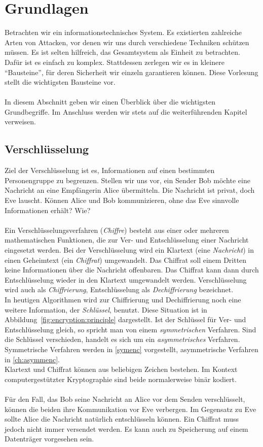 \section{Grundlagen}
Betrachten wir ein informationstechnisches System. Es existierten zahlreiche Arten von Attacken, vor denen wir uns durch verschiedene Techniken schützen müssen. Es ist selten hilfreich, das Gesamtsystem als Einheit zu betrachten. Dafür ist es einfach zu komplex. Stattdessen zerlegen wir es in kleinere "`Bausteine"', für deren Sicherheit wir einzeln garantieren können. Diese Vorlesung stellt die wichtigsten Bausteine vor.\\ \ \\
In diesem Abschnitt geben wir einen Überblick über die wichtigsten Grundbegriffe. Im Anschluss werden wir stets auf die weiterführenden Kapitel verweisen.

\subsection{Verschlüsselung}

Ziel der Verschlüsselung ist es, Informationen auf einen bestimmten Personengruppe zu begrenzen. Stellen wir uns vor, ein Sender Bob möchte eine Nachricht an eine Empfängerin Alice übermitteln. Die Nachricht ist privat, doch Eve lauscht. Können Alice und Bob kommunizieren, ohne das Eve sinnvolle Informationen erhält? Wie?\\ \ \\
Ein Verschlüsselungsverfahren (\emph{Chiffre}) besteht aus einer oder mehreren mathematischen Funktionen, die zur Ver- und Entschlüsselung einer Nachricht eingesetzt werden. Bei der Verschlüsselung wird ein Klartext (eine \emph{Nachricht}) in einen Geheimtext (ein \emph{Chiffrat}) umgewandelt. Das Chiffrat soll einem Dritten keine Informationen über die Nachricht offenbaren. Das Chiffrat kann dann durch Entschlüsselung wieder in den Klartext umgewandelt werden. Verschlüsselung wird auch als \emph{Chiffrierung}, Entschlüsselung als \emph{Dechiffrierung} bezeichnet.\\
In heutigen Algorithmen wird zur Chiffrierung und Dechiffrierung noch eine weitere Information, der \emph{Schlüssel}, benutzt. Diese Situation ist in Abbildung~\ref{fig:encryption:principle} dargestellt. Ist der Schlüssel für Ver- und Entschlüsselung gleich, so spricht man von einem \emph{symmetrischen} Verfahren. Sind die Schlüssel verschieden, handelt es sich um ein \emph{asymmetrisches} Verfahren. Symmetrische Verfahren werden in \autoref{symenc} vorgestellt, asymmetrische Verfahren in \autoref{ch:asymmenc}.\\
Klartext und Chiffrat können aus beliebigen Zeichen bestehen. Im Kontext computergestützter Kryptographie sind beide normalerweise binär kodiert.\\ \ \\
Für den Fall, das Bob seine Nachricht an Alice vor dem Senden verschlüsselt, können die beiden ihre Kommunikation vor Eve verbergen. Im Gegensatz zu Eve sollte Alice die Nachricht natürlich entschlüsseln können. Ein Chiffrat muss jedoch nicht immer versendet werden. Es kann auch zu Speicherung auf einem Datenträger vorgesehen sein.

